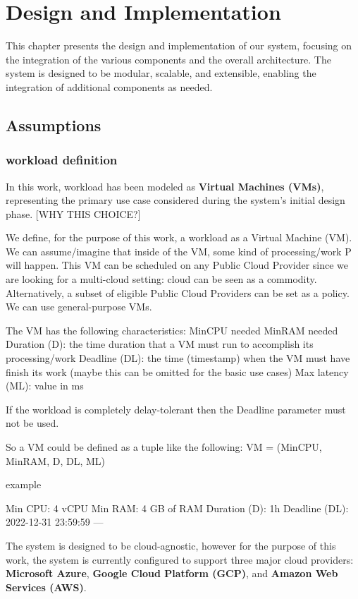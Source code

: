 \chapter{Design and Implementation}
\label{cha:design}

This chapter presents the design and implementation of our system, focusing on the integration of the various components and the overall architecture. The system is designed to be modular, scalable, and extensible, enabling the integration of additional components as needed.

\section{Assumptions}



\subsection{workload definition}
In this work, workload has been modeled as \textbf{Virtual Machines (VMs)}, representing the primary use case considered during the system's initial design phase. 
[WHY THIS CHOICE?]

We define, for the purpose of this work, a workload as a Virtual Machine (VM).
We can assume/imagine that inside of the VM, some kind of processing/work P will happen.
This VM can be scheduled on any Public Cloud Provider since we are looking for a multi-cloud setting: cloud can be seen as a commodity. 
Alternatively, a subset of eligible Public Cloud Providers can be set as a policy.
We can use general-purpose VMs.

The VM has the following characteristics:
MinCPU needed
MinRAM needed
Duration (D): the time duration that a VM must run to accomplish its processing/work
Deadline (DL): the time (timestamp) when the VM must have finish its work (maybe this can be omitted for the basic use cases)
Max latency (ML): value in ms 

If the workload is completely delay-tolerant then the Deadline parameter must not be used.

So a VM could be defined as a tuple like the following:
VM = (MinCPU, MinRAM, D, DL, ML)


example

Min CPU: 4 vCPU
Min RAM: 4 GB of RAM
Duration (D): 1h
Deadline (DL): 2022-12-31 23:59:59
---

The system is designed to be cloud-agnostic, however for the purpose of this work, the system is currently configured to support three major cloud providers: \textbf{Microsoft Azure}, \textbf{Google Cloud Platform (GCP)}, and \textbf{Amazon Web Services (AWS)}.


